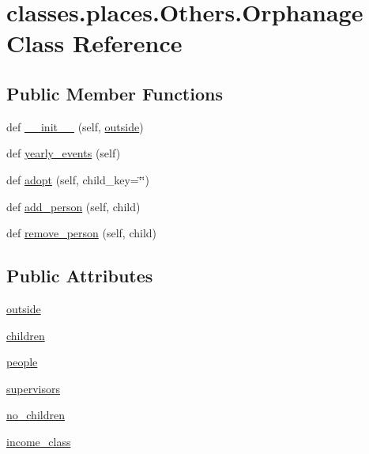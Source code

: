 \hypertarget{classclasses_1_1places_1_1Others_1_1Orphanage}{}\section{classes.\+places.\+Others.\+Orphanage Class Reference}
\label{classclasses_1_1places_1_1Others_1_1Orphanage}
\subsection*{Public Member Functions}
\begin{DoxyCompactItemize}
\item 
def \hyperlink{classclasses_1_1places_1_1Others_1_1Orphanage_a847cea87bd6710175649bfc45e5ec71d}{\+\_\+\+\_\+init\+\_\+\+\_\+} (self, \hyperlink{classclasses_1_1places_1_1Others_1_1Orphanage_a505b02c21196d3f3d1b5cb55d4354101}{outside})
\item 
def \hyperlink{classclasses_1_1places_1_1Others_1_1Orphanage_a79ef19aeabe1c56b9d2423067188b59b}{yearly\+\_\+events} (self)
\item 
def \hyperlink{classclasses_1_1places_1_1Others_1_1Orphanage_a7b3c48298e535060cd118183593bfd47}{adopt} (self, child\+\_\+key=\char`\"{}\char`\"{})
\item 
def \hyperlink{classclasses_1_1places_1_1Others_1_1Orphanage_a3e7702b0ba642f79300daafdef4c0ec0}{add\+\_\+person} (self, child)
\item 
def \hyperlink{classclasses_1_1places_1_1Others_1_1Orphanage_aeade8071f40af1ef35dc7a3593945a6b}{remove\+\_\+person} (self, child)
\end{DoxyCompactItemize}
\subsection*{Public Attributes}
\begin{DoxyCompactItemize}
\item 
\hyperlink{classclasses_1_1places_1_1Others_1_1Orphanage_a505b02c21196d3f3d1b5cb55d4354101}{outside}
\item 
\hyperlink{classclasses_1_1places_1_1Others_1_1Orphanage_aad2f1e96c5bebea993ba95575d659a42}{children}
\item 
\hyperlink{classclasses_1_1places_1_1Others_1_1Orphanage_a667b44e4d118a009ac107ebc042312a4}{people}
\item 
\hyperlink{classclasses_1_1places_1_1Others_1_1Orphanage_abf38d97a27d1d66f13bbf0b00c6473b8}{supervisors}
\item 
\hyperlink{classclasses_1_1places_1_1Others_1_1Orphanage_a00f81f82fef9a60b1389778a09d3a91f}{no\+\_\+children}
\item 
\hyperlink{classclasses_1_1places_1_1Others_1_1Orphanage_a30da2c2d787e62d2c90e862b2f8eb213}{income\+\_\+class}
\end{DoxyCompactItemize}


